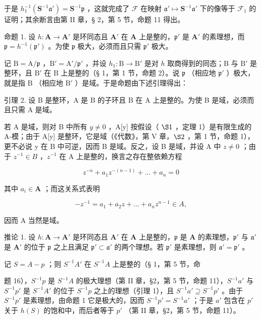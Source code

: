 于是 \(h_1^{-1}(\mathbf{S}^{-1}\mathfrak{a}') = \mathbf{S}^{-1}\mathfrak{p}\) ，这就完成了 \(\mathcal{F}\) 在映射 \(\mathfrak{a}' \mapsto \mathbf{S}^{-1}\mathfrak{a}'\) 下的像等于 \(\mathcal{F}_1\) 的证明；其余断言由第 II 章，§ 2，第 5 节，命题 11 得出。

命题 1. 设 \(h: \mathbf{A} \to \mathbf{A}'\) 是环同态且 \(\mathbf{A}'\) 在 \(\mathbf{A}\) 上是整的，\(\mathfrak{p}'\) 是 \(\mathbf{A}'\) 的素理想，而 \(\mathfrak{p} = h^{-1}(\mathfrak{p}')\) 。为使 \(\mathfrak{p}\) 极大，必须而且只需 \(\mathfrak{p}'\) 极大。

记 \(\mathrm{B} = \mathrm{A} / \mathfrak{p}\) ，\(\mathrm{B}' = \mathrm{A}' / \mathfrak{p}'\) ，并设 \(h_1 \colon \mathrm{B} \to \mathrm{B}'\) 是对 \(h\) 取商得到的同态；\(\mathrm{B}\) 与 \(\mathrm{B}'\) 是整环，且 \(\mathrm{B}'\) 在 \(\mathrm{B}\) 上是整的（§ 1，第 1 节，命题 2）。说 \(\mathfrak{p}\) （相应地 \(\mathfrak{p}'\) ）极大，就是指 \(\mathrm{B}\) （相应地 \(\mathrm{B}'\) ）是域。于是命题由下述引理得出：

引理 2. 设 B 是整环，A 是 B 的子环且 B 在 A 上是整的。为使 B 是域，必须而且只需 A 是域。

若 A 是域，则对 B 中所有 \(y \neq 0\) ，A[y] 按假设（ \(\S 1\) ，定理 1）是有限生成的 A-模；由于 A[y] 是整环，它是域（《代数》，第 V 章，\(\S 2\) ，第 1 节，命题 1），更不必说 y 在 B 中可逆，因而 B 是域。反之，设 B 是域，并设 A 中 \(z \neq 0\) ；由于 \(z^{-1} \in B\) ，\(z^{-1}\) 在 A 上是整的，换言之存在整依赖方程

\[
z ^ {- n} + a _ {1} z ^ {- (n - 1)} + \dots + a _ {n} = 0
\]

其中 \(a_{i} \in \mathbf{A}\) ；而这关系式表明

\[
- z ^ {- 1} = a _ {1} + a _ {2} z + \dots + a _ {n} z ^ {n - 1} \in A,
\]

因而 A 当然是域。

推论 1. 设 \(h: \mathbf{A} \to \mathbf{A}'\) 是环同态且 \(\mathbf{A}'\) 在 \(\mathbf{A}\) 上是整的，\(\mathfrak{p}\) 是 \(\mathbf{A}\) 的素理想，\(\mathfrak{p}'\) 与 \(\mathfrak{a}'\) 是 \(\mathbf{A}'\) 的位于 \(\mathfrak{p}\) 之上且满足 \(\mathfrak{p}' \subset \mathfrak{a}'\) 的两个理想。若 \(\mathfrak{p}'\) 是素理想，则 \(\mathfrak{a}' = \mathfrak{p}'\) 。

记 \(S = A - p\) ；则 \(S^{-1}A'\) 在 \(S^{-1}A\) 上是整的（§ 1，第 5 节，命

题 16），\(S^{-1}p\) 是 \(S^{-1}A\) 的极大理想（第 II 章，§2，第 5 节，命题 11），\(S^{-1}a'\) 与 \(S^{-1}p'\) 是 \(S^{-1}A'\) 的位于 \(S^{-1}p\) 之上的理想（引理 1），且 \(S^{-1}a' \supseteq S^{-1}p'\) 。由于 \(S^{-1}p'\) 是素理想，由命题 1 它是极大的，因而 \(S^{-1}p' = S^{-1}a'\) ；于是 \(a'\) 包含在 \(p'\) 关于 \(h(S)\) 的饱和中，而后者等于 \(p'\) （第 II 章，§2，第 5 节，命题 11）。

